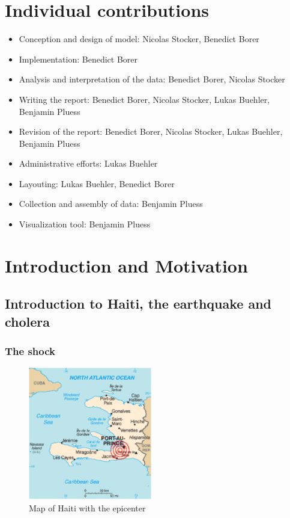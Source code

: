\documentclass[11pt]{article}
\begin{document}
\newpage
\section{Individual contributions}
\begin{itemize}
\item Conception and design of model: Nicolas Stocker, Benedict Borer
\item Implementation: Benedict Borer
\item Analysis and interpretation of the data: Benedict Borer, Nicolas Stocker
\item Writing the report: Benedict Borer, Nicolas Stocker, Lukas Buehler, Benjamin Pluess
\item Revision of the report: Benedict Borer, Nicolas Stocker, Lukas Buehler, Benjamin Pluess
\item Administrative efforts: Lukas Buehler
\item Layouting: Lukas Buehler, Benedict Borer
\item Collection and assembly of data: Benjamin Pluess
\item Visualization tool: Benjamin Pluess
\end{itemize}


\newpage
\section{Introduction and Motivation}
\subsection{Introduction to Haiti, the earthquake and cholera }
\subsubsection*{The shock}


\begin{figure}
\includegraphics[width=0.48\textwidth]{Bilder/KarteHaiti.png}
\caption{Map of Haiti with the epicenter \cite{wikipedia:map}}
\label{pic:map_haiti}
\end{figure}
\end{document}
